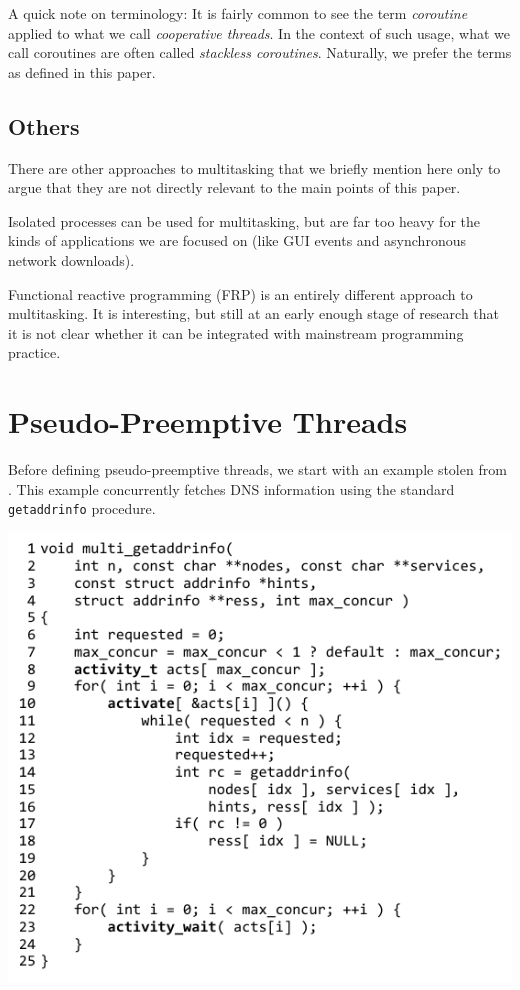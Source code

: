 \documentclass[10pt,preprint]{sigplanconf}
\begin{document}
A quick note on terminology: It is fairly common to see the term \emph{coroutine} applied to what we call \emph{cooperative threads}.
In the context of such usage, what we call coroutines are often called \emph{stackless coroutines}.
Naturally, we prefer the terms as defined in this paper.

\subsection{Others}

There are other approaches to multitasking that we briefly mention here only to argue that they are not directly relevant to the main points of this paper.

Isolated processes can be used for multitasking, but are far too heavy for the kinds of applications we are focused on (like GUI events and asynchronous network downloads).

Functional reactive programming (FRP) is an entirely different approach to multitasking.
It is interesting, but still at an early enough stage of research that it is not clear whether it can be integrated with mainstream programming practice.

\section{Pseudo-Preemptive Threads}

Before defining pseudo-preemptive threads, we start with an example stolen from \cite{Krohn2007}.
This example concurrently fetches DNS information using the standard \texttt{getaddrinfo} procedure.

\hspace{-0.5cm}
\includegraphics{multi_getaddrinfo}
\end{document}
